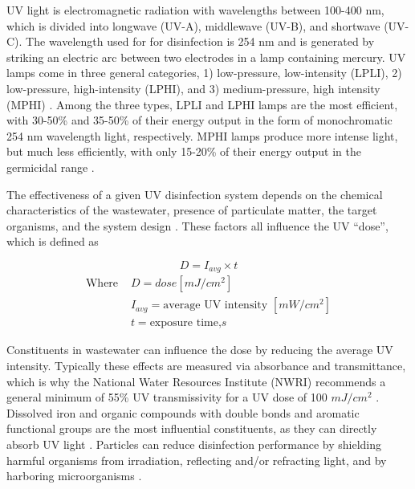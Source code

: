 \documentclass[11pt,letterpaper,final]{report}
\begin{document}
UV light is electromagnetic radiation with wavelengths between 100-400 nm, which is divided into longwave (UV-A), middlewave (UV-B), and shortwave (UV-C). The wavelength used for for disinfection is 254 nm and is generated by striking an electric arc between two electrodes in a lamp containing mercury\cite{ELShahawy2019}. UV lamps come in three general categories, 1) low-pressure, low-intensity (LPLI), 2) low-pressure, high-intensity (LPHI), and 3) medium-pressure, high intensity (MPHI) \cite{Metcalf}. Among the three types, LPLI and LPHI lamps are the most efficient, with 30-50\% and 35-50\% of their energy output in the form of monochromatic 254 nm wavelength light, respectively. MPHI lamps produce more intense light, but much less efficiently, with only 15-20\% of their energy output in the germicidal range \cite{Metcalf}.

The effectiveness of a given UV disinfection system depends on the chemical characteristics of the wastewater, presence of particulate matter, the target organisms, and the system design \cite{Metcalf}. These factors all influence the UV “dose”, which is defined as 



\setlength{\parskip}{0pt}
\begin{equation}
    D=I_{avg} \times t
  \end{equation}
  \begin{align*}
    \text{Where }&D= dose [mJ/cm^2]\\
    & I_{avg}= \text{average UV intensity }[mW/cm^2]\\
    & t=\text{exposure time,} s
  \end{align*}

  \setlength{\parskip}{\baselineskip}

Constituents in wastewater can influence the dose by reducing the average UV intensity. Typically these effects are measured via absorbance and transmittance, which is why the National Water Resources Institute (NWRI) recommends a general minimum of 55\% UV transmissivity for a UV dose of 100 $mJ/cm^2$ \cite{NPDES}. Dissolved iron and organic compounds with double bonds and aromatic functional groups are the most influential constituents, as they can directly absorb UV light \cite{Metcalf}. Particles can reduce disinfection performance by shielding harmful organisms from irradiation, reflecting and/or refracting light, and by harboring microorganisms \cite{Metcalf}.
\end{document}
